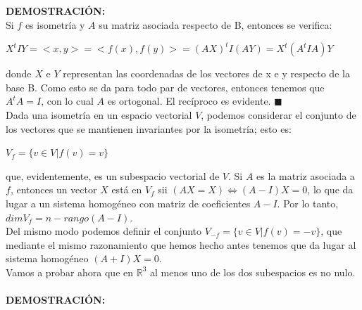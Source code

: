 \documentclass[10pt,a4paper]{article}
\theoremstyle{mystyle}
\newtheorem{prop}{\textcolor{green}{\textbf{Proposición}}}
\begin{document}
\textbf{DEMOSTRACIÓN:}\\

Si $f$ es isometría y $A$ su matriz asociada respecto de B, entonces se verifica:\\

\begin{center}
$X^tIY = <x,y> = <f(x),f(y)> = (AX)^tI(AY) = X^t(A^tIA)Y$
\end{center}

donde $X$ e $Y$ representan las coordenadas de los vectores de x e y respecto de la base B. Como esto se da para todo par de vectores, entonces tenemos que $A^tA = I$, con lo cual $A$ es ortogonal. El recíproco es evidente. $\blacksquare$\\

Dada una isometría en un espacio vectorial $V$, podemos considerar el conjunto de los vectores que se mantienen invariantes por la isometría; esto es:\\

\begin{center}
$V_f = \lbrace v \in V \vert f(v) = v \rbrace$
\end{center}

que, evidentemente, es un subespacio vectorial de $V$. Si $A$ es la matriz asociada a $f$, entonces un vector $X$ está en $V_f$ sii $(AX = X) \Longleftrightarrow (A-I)X = 0$, lo que da lugar a un sistema homogéneo con matriz de coeficientes $A-I$. Por lo tanto, $dim V_f = n - rango(A-I)$.\\

Del mismo modo podemos definir el conjunto $V_{-f} = \lbrace v \in V \vert f(v) = -v \rbrace$,  que mediante el mismo razonamiento que hemos hecho antes tenemos que da lugar al sistema homogéneo $(A+I)X = 0$.\\

Vamos a probar ahora que en $\mathbb{R}^3$ al menos uno de los dos subespacios es no nulo.\\

\hfill \\

\textbf{DEMOSTRACIÓN:}\\
\end{document}
